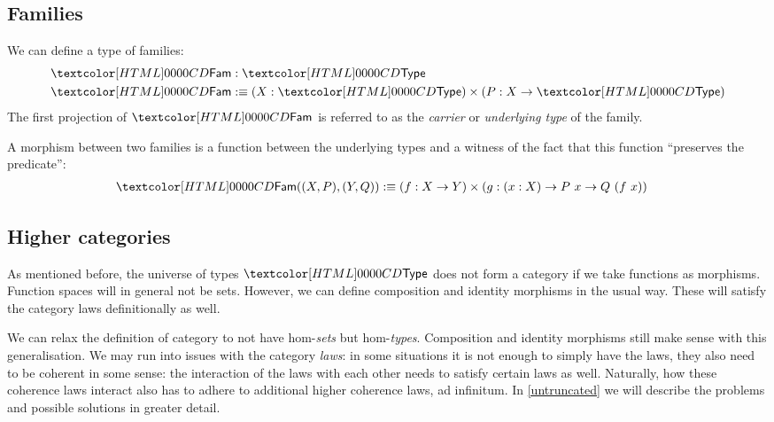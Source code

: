 \subsection{Families}

We can define a type of families:
\begin{align*}
  &\Fam : \Type \\
  &\Fam \ddefeq (X : \Type) \times (P : X \to \Type)
\end{align*}
The first projection of $\Fam$ is referred to as the \emph{carrier} or
\emph{underlying type} of the family.

A morphism between two families is a function between the underlying
types and a witness of the fact that this function ``preserves the
predicate'':
\begin{align*}
  &\Fam((X,P),(Y,Q)) \ddefeq (f : X \to Y) \times (g : (x : X) \to P\ x \to Q\ (f\ x))
\end{align*}

\subsection{Higher categories}
\label{higher-cats}

As mentioned before, the universe of types $\Type$ does not form a
category if we take functions as morphisms. Function spaces will in
general not be sets. However, we can define composition and identity
morphisms in the usual way. These will satisfy the category laws
definitionally as well.

We can relax the definition of category to not have hom-\emph{sets}
but hom-\emph{types}. Composition and identity morphisms still make
sense with this generalisation. We may run into issues with the
category \emph{laws}: in some situations it is not enough to simply
have the laws, they also need to be coherent in some sense: the
interaction of the laws with each other needs to satisfy certain laws
as well. Naturally, how these coherence laws interact also has to
adhere to additional higher coherence laws, ad infinitum. In
\cref{untruncated} we will describe the problems and possible
solutions in greater detail.
